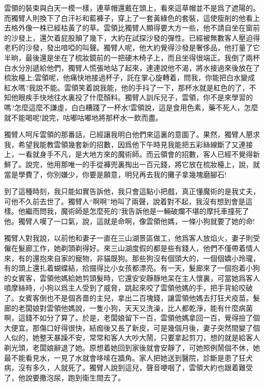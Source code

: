 \documentclass[a6paper]{article}
\begin{document}
雲領的裝束與白天一模一樣，連草帽還戴在頭上，看來這草帽並不是爲了遮陽的。而獨臂人則換下了白汗衫和藍褲子，穿上了一套黃綠色的套裝，這使瘦削的他看上去格外像一株已經枯黃了的草。雲領比獨臂人顯得要大方一些，他不請自坐在窗前的沙發上，還欠着屁股顛了幾下，大約在試探沙發的彈性。已經被無數客人壓迫得老朽的沙發，發出喑啞的叫聲。獨臂人呢，他大約覺得沙發是奢侈品，他打量了它半晌，最後還是坐在了梳妝鏡前的一把硬木椅子上，而且坐得很端正。我倒了兩杯白水分別遞給他們，獨臂人慌張地站了起來，連連說他不渴，將水接過來後放在了梳妝檯上;雲領呢，他痛快地接過杯子，託在掌心旋轉着，問我，你能把白水變成紅水嗎?我說不能。雲領笑着說我能，他的手抖了一下，那杯水就是紅色的了，不知他眼疾手快地往水裏投了什麼顏料。獨臂人訓斥兒子，雲領，你不是來學習的嗎?怎麼這麼不謙虛，白白糟踐了一杯水!雲領說，這是食用色素，藥不死人，怎麼就不能喝呢!說完，咕嘟咕嘟地將那杯水一飲而盡。

獨臂人呵斥雲領的那番話，已經讓我明白他們來這裏的意圖了。果然，獨臂人懇求我，希望我能教雲領幾套新的招數，因爲他下午時見我能把五彩絲線斷了又連接上，一看就身手不凡，是大地方來的魔術師。而云領會的招數，客人已經不覺得新鮮了。說完，他用那唯一的手從褲兜裏掏出一百元錢，將它放在梳妝檯上，說，就當是學費了，你別嫌少，你要是願意，明兒再去我的攤子拿幾塊磨腳石!

到了這種時刻，我只能如實告訴他，我只會這點小把戲，真正懂魔術的是我丈夫，可他不久前去世了。獨臂人“啊啊”地叫了兩聲，說着對不起，我沒有想到會是這樣。他繼而問我，魔術師是怎麼死的?我告訴他是一輛破爛不堪的摩托車撞死了他。獨臂人嘆了一口氣，說，這就是命啊，像雲領他媽，一條小狗就要了她的命!

獨臂人對我說，以前他和妻子一直在三山湖景區做工，他爲客人放焰火，妻子則受僱在髮廊工作，她剃頭剃得好。來三山湖度假的都是些有錢人，他們不僅帶着情人來，有的還抱來自家的寵物，非貓既狗。那些狗沒有個頭大的，一個個嬌小玲瓏，有的頭上還扎着蝴蝶結，拾掇得比小女孩都漂亮。有一天，髮廊來了一個抱着小狗的女賓客，雲領他媽給她剪頭髮時，它還安安靜靜地呆在主人懷裏，可當她爲客人噴摩絲時，小狗以爲主人受到了威脅，跳起來咬了雲領他媽的手，把手背給咬破了。女賓客倒也不是個吝嗇的主兒，拿出二百塊錢，讓雲領他媽去打狂犬疫苗。髮廊的老闆娘對雲領他媽說，一隻小狗，天天又洗澡，比人都乾淨，能有什麼病菌啊，這錢不如分了算了。於是，老闆娘留下一百，雲領他媽拿回一百，覺得撿了個大便宜。那傷口好得很快，結痂後又長了新皮，可是幾個月後，妻子突然間變了個人似的，她整天暴躁不安，常常和客人大吵大鬧，只要拿起剪刀，想的就是給客人剃光頭，老闆娘辭退了她。原想着她回到家後就會安靜了，可她照例鬧個不休，她最不能看見水，一見了水就會哆嗦在牆角。家人把她送到醫院，診斷是患了狂犬病，沒有多久，人就死了。獨臂人說到這兒，聲音哽咽了，雲領大約也跟着難受了，他說要撒泡尿，跑到衛生間去了。
\end{document}
